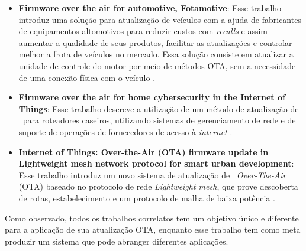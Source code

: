 \begin{itemize}

    \item \textbf{Firmware over the air for automotive, Fotamotive}: Esse trabalho introduz uma solução para atualização de veículos com a ajuda de fabricantes de equipamentos altomotivos para reduzir custos com \textit{recalls} e assim aumentar a qualidade de seus produtos, facilitar as atualizações e controlar melhor a frota de veículos no mercado. Essa solução consiste em atualizar a unidade de controle do motor por meio de métodos OTA, sem a necessidade de uma conexão física com o veículo \cite{Odat2014}.

    \item \textbf{Firmware over the air for home cybersecurity in the Internet of Things}: Esse trabalho descreve a utilização de um método de atualização de \firmware\ para roteadores caseiros, utilizando sistemas de gerenciamento de rede e de suporte de operações de fornecedores de acesso à \textit{internet} \cite{Teng2017}.
    
    \item \textbf{Internet of Things: Over-the-Air (OTA) firmware update in Lightweight mesh network protocol for smart urban development}: Esse trabalho introduz um novo sistema de atualização de \firmware\ \textit{Over-The-Air} (OTA) baseado no protocolo de rede \textit{Lightweight mesh}, que prove descoberta de rotas, estabelecimento e um protocolo de malha de baixa potência \cite{Chandra2016}.

\end{itemize}

Como observado, todos os trabalhos correlatos tem um objetivo único e diferente para a aplicação de sua atualização OTA, enquanto esse trabalho tem como meta produzir um sistema que pode abranger diferentes aplicações.